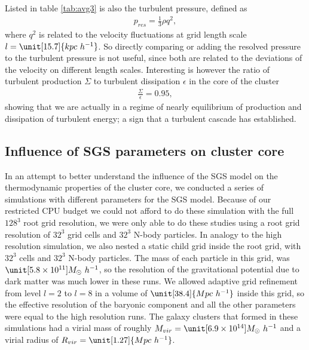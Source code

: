 Listed in table \ref{tab:avg3} is also the turbulent pressure, defined as
\begin{align}
p_{res}=\frac{1}{3} \rho q^2,
\end{align}
where $q^2$ is related to the velocity fluctuations at grid length scale 
$l=\unit[15.7]{kpc\ h^{-1}}$. So directly comparing or adding the resolved
pressure to the turbulent pressure is not useful, since both are related to the
deviations of the velocity on different length scales. Interesting is however
the ratio of turbulent production $\Sigma$ to turbulent dissipation $\epsilon$
in the core of the cluster
\begin{align}
\frac{\Sigma}{\epsilon}=0.95,
\end{align}
showing that we are actually in a regime of nearly equilibrium of production and
dissipation of turbulent energy; a sign that a turbulent cascade has
established.

\subsection{Influence of SGS parameters on cluster core}
In an attempt to better understand the influence of the SGS model on the
thermodynamic properties of the cluster core, we conducted a series of
simulations with different parameters for the SGS model. Because of our
restricted CPU budget we could not afford to do these simulation with the full
$128^3$ root grid resolution, we were only able to do these studies using a
root grid resolution of $32^3$ grid cells and $32^3$ N-body particles. In
analogy to the high resolution simulation, we also nested a static child grid
inside the root grid, with $32^3$ cells and $32^3$ N-body particles. The mass
of each particle in this grid, was $\unit[5.8 \times 10^{11}]{M_{\odot}\
h^{-1}}$,
so the resolution of the gravitational potential due to dark matter was much
lower in these runs. We allowed adaptive grid refinement from level
$l=2$ to $l=8$ in a volume of $\unit[38.4]{Mpc\ h^{-1}}$ inside this grid, so
the effective resolution of the baryonic component and all the other
parameters were equal to the high resolution runs.
The galaxy clusters that formed in these simulations had a virial mass of
roughly $M_{vir}=\unit[6.9 \times 10^{14}]{M_{\odot}\ h^{-1}}$ and a virial
radius
of $R_{vir}=\unit[1.27]{Mpc\ h^{-1}}$.

